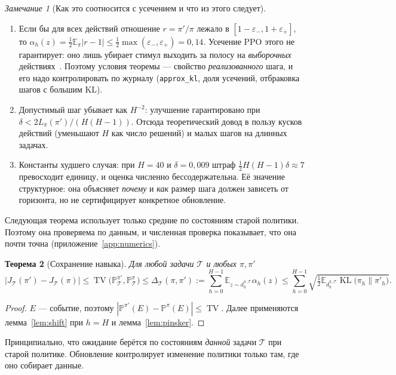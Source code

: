 \documentclass[11pt,a4paper]{article}
\theoremstyle{plain}
\newtheorem{theorem}{Теорема}[section]
\theoremstyle{definition}
\theoremstyle{remark}
\newtheorem{remark}[theorem]{Замечание}
\newcommand{\E}{\mathbb{E}}
\newcommand{\PP}{\mathbb{P}}
\DeclareMathOperator{\TV}{TV}
\DeclareMathOperator{\KL}{KL}
\newcommand{\cT}{\mathcal{T}}
\begin{document}
\begin{remark}[Как это соотносится с усечением и что из этого следует]\label{rem:clip}
\begin{enumerate}[label=(\roman*)]
\item Если бы для всех действий отношение $r=\pi'/\pi$ лежало в $[1-\varepsilon_-,1+\varepsilon_+]$, то $\alpha_h(z)=\tfrac12\E_\pi|r-1|\le\tfrac12\max(\varepsilon_-,\varepsilon_+)=0{,}14$. Усечение PPO этого не гарантирует: оно лишь убирает стимул выходить за полосу на \emph{выборочных} действиях~\cite{engstrom,truly-ppo}. Поэтому условия теоремы --- свойство \emph{реализованного} шага, и его надо контролировать по журналу (\texttt{approx\_kl}, доля усечений, отбраковка шагов с большим KL).
\item Допустимый шаг убывает как $H^{-2}$: улучшение гарантировано при $\delta<2L_\pi(\pi')/(H(H-1))$. Отсюда теоретический довод в пользу кусков действий (уменьшают $H$ как число решений) и малых шагов на длинных задачах.
\item Константы худшего случая: при $H=40$ и $\delta=0{,}009$ штраф $\tfrac12H(H-1)\delta\approx7$ превосходит единицу, и оценка численно бессодержательна. Её значение структурное: она объясняет \emph{почему} и \emph{как} размер шага должен зависеть от горизонта, но не сертифицирует конкретное обновление.
\end{enumerate}
\end{remark}

Следующая теорема использует только средние по состояниям старой политики. Поэтому она проверяема по данным, и численная проверка показывает, что она почти точна (приложение~\ref{app:numerics}).

\begin{theorem}[Сохранение навыка]\label{thm:retention}
Для любой задачи $\cT$ и любых $\pi,\pi'$
\[
\bigl|J_\cT(\pi')-J_\cT(\pi)\bigr|\le\TV\bigl(\PP^{\pi'}_\cT,\PP^\pi_\cT\bigr)\le\Delta_\cT(\pi,\pi'):=\sum_{h=0}^{H-1}\E_{z\sim d^{\pi,\cT}_h}\alpha_h(z)
\le\sum_{h=0}^{H-1}\sqrt{\tfrac12\E_{d^{\pi,\cT}_h}\KL\bigl(\pi_h\|\pi'_h\bigr)} .
\]
\end{theorem}
\begin{proof}
$E$ --- событие, поэтому $|\PP^{\pi'}(E)-\PP^\pi(E)|\le\TV$. Далее применяются лемма~\ref{lem:shift} при $h=H$ и лемма~\ref{lem:pinsker}.
\end{proof}

Принципиально, что ожидание берётся по состояниям \emph{данной} задачи $\cT$ при старой политике. Обновление контролирует изменение политики только там, где оно собирает данные.
\end{document}
